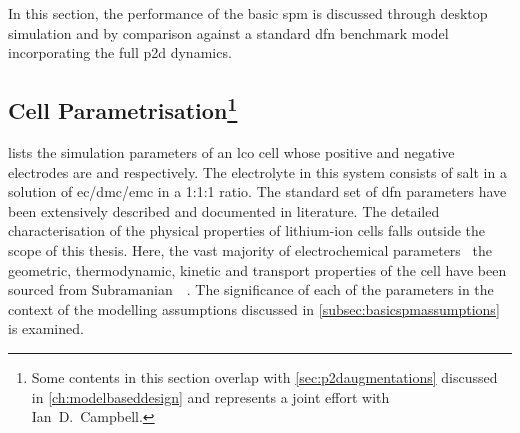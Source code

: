 
In this  section, the performance  of the  basic \gls{spm} is  discussed through
desktop  simulation and  by comparison  against a  standard \gls{dfn}  benchmark
model incorporating the full \gls{p2d} dynamics.


\subsection[Cell   Parametrisation]{Cell   Parametrisation\protect\footnote{Some    contents   in   this
section     overlap     with    \cref{sec:p2daugmentations}     discussed     in
\cref{ch:modelbaseddesign}  and represents  a  joint effort  with \mbox{Ian  D.\
Campbell}.}}\label{subsec:spmp2dparametrisation}



 lists  the simulation  parameters of  an \gls{lco}
cell  whose positive  and negative  electrodes are  \ch{LiCoO_2} and  \ch{LiC_6}
respectively.  The  electrolyte in  this  system  consists of  \ch{LiPF_6}  salt
in  a   solution  of   \gls{ec}/\gls{dmc}/\gls{emc}  in   a  1:1:1   ratio.  The
standard  set  of  \gls{dfn}  parameters have  been  extensively  described  and
documented  in  literature.  The   detailed  characterisation  of  the  physical
properties  of  lithium-ion  cells  falls  outside the  scope  of  this  thesis.
Here,  the vast  majority of  electrochemical parameters  \viz~the  geometric,
thermodynamic, kinetic  and transport properties  of the cell have  been sourced
from  Subramanian~\etal{}~\cite{Subramanian2009}. The  significance  of each  of
the  parameters  in  the  context  of the  modelling  assumptions  discussed  in
\cref{subsec:basicspmassumptions} is examined.

